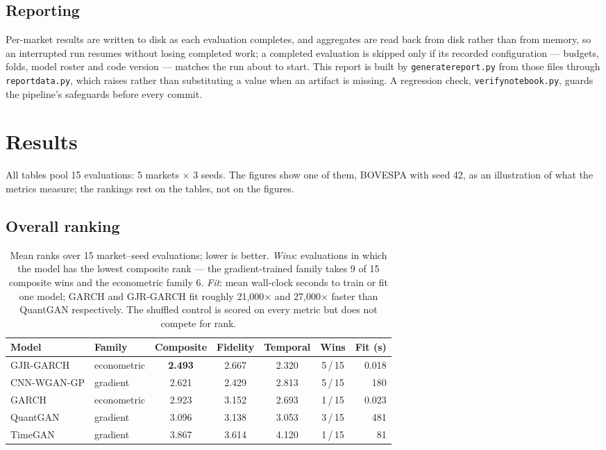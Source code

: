 \documentclass[11pt,a4paper]{article}
\makeatletter
\DeclareRobustCommand{\_}{\ifmmode\nfss@text{\textunderscore}\else\textunderscore\allowbreak\fi}
\makeatother
\begin{document}
\subsection{Reporting}
Per-market results are written to disk as each evaluation completes, and aggregates are read back from disk rather than from memory, so an interrupted run resumes without losing completed work; a completed evaluation is skipped only if its recorded configuration --- budgets, folds, model roster and code version --- matches the run about to start. This report is built by \texttt{generate\_report.py} from those files through \texttt{report\_data.py}, which raises rather than substituting a value when an artifact is missing. A regression check, \texttt{verify\_notebook.py}, guards the pipeline's safeguards before every commit.
\section{Results}
\label{sec:results}
All tables pool 15 evaluations: 5 markets $\times$ 3 seeds. The figures show one of them, BOVESPA with seed 42, as an illustration of what the metrics measure; the rankings rest on the tables, not on the figures.

\subsection{Overall ranking}
\label{sec:ranking}

\begin{table}[htbp]
\centering
\caption{Mean ranks over 15 market--seed evaluations; lower is better. \emph{Wins}: evaluations in which the model has the lowest composite rank --- the gradient-trained family takes 9 of 15 composite wins and the econometric family 6. \emph{Fit}: mean wall-clock seconds to train or fit one model; GARCH and GJR-GARCH fit roughly 21,000$\times$ and 27,000$\times$ faster than QuantGAN respectively. The shuffled control is scored on every metric but does not compete for rank.}
\label{tab:ranking}
\begin{tabular}{@{}llccccr@{}}
\toprule
Model & Family & Composite & Fidelity & Temporal & Wins & Fit (s) \\
\midrule
GJR-GARCH & econometric & \textbf{2.493} & 2.667 & 2.320 & 5\,/\,15 & 0.018 \\
CNN-WGAN-GP & gradient & 2.621 & 2.429 & 2.813 & 5\,/\,15 & 180 \\
GARCH & econometric & 2.923 & 3.152 & 2.693 & 1\,/\,15 & 0.023 \\
QuantGAN & gradient & 3.096 & 3.138 & 3.053 & 3\,/\,15 & 481 \\
TimeGAN & gradient & 3.867 & 3.614 & 4.120 & 1\,/\,15 & 81 \\
\bottomrule
\end{tabular}
\end{table}
\end{document}
